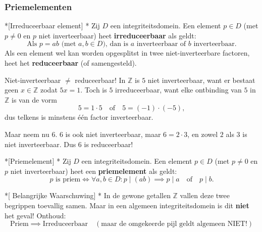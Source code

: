 \subsubsection{Priemelementen}

\begin{nicedefinition}*[Irreduceerbaar element]\label{H4_irreduceerbaar_element}
    \nextpart[]*
    Zij $D$ een integriteitsdomein. Een element $p \in D$ (met $p \neq 0$ en $p$ niet inverteerbaar) heet \textcolor{PineGreen!75!black}{\textbf{irreduceerbaar}} als geldt:
    \begin{equation*}
        \text{Als } p = ab \text{ (met } a,b \in D\text{), dan is } a \text{ inverteerbaar of } b \text{ inverteerbaar.}
    \end{equation*}
    Als een element wel kan worden opgesplitst in twee niet-inverteerbare factoren, heet het \textcolor{PineGreen!75!black}{\textbf{reduceerbaar}} (of samengesteld).
\end{nicedefinition}

\textbf{} Niet-inverteerbaar $\neq$ reduceerbaar! In $\mathbb{Z}$ is $5$ niet inverteerbaar, want er bestaat geen $x\in\mathbb{Z}$ zodat $5x=1$. Toch is $5$ irreduceerbaar, want elke ontbinding van $5$ in $\mathbb{Z}$ is van de vorm
\begin{equation*}
    5=1\cdot 5
    \quad \text{of} \quad
    5=(-1)\cdot(-5),
\end{equation*}
dus telkens is minstens één factor inverteerbaar.

Maar neem nu $6$. $6$ is ook niet inverteerbaar, maar $6 = 2\cdot 3$, en zowel $2$ als $3$ is niet inverteerbaar. Dus $6$ is reduceerbaar!

\begin{nicedefinition}*[Priemelement]
    \nextpart[]*
    Zij $D$ een integriteitsdomein. Een element $p \in D$ (met $p \neq 0$ en $p$ niet inverteerbaar) heet een \textcolor{PineGreen!75!black}{\textbf{priemelement}} als geldt:
    \begin{equation*}
        p \text{ is priem} \iff \forall a,b \in D: p \mid (ab) \implies p \mid a \quad \text{of} \quad p \mid b.
    \end{equation*}
\end{nicedefinition}

\begin{nicenote}*[ Belangrijke Waarschuwing]
    \nextpart[]*
    In de gewone getallen $\mathbb{Z}$ vallen deze twee begrippen toevallig samen. Maar in een algemeen integriteitsdomein is dit \textbf{niet} het geval! Onthoud:
    \begin{equation*}
        \text{Priem} \implies \text{Irreduceerbaar} \quad (\text{maar de omgekeerde pijl geldt algemeen NIET!})
    \end{equation*}
\end{nicenote}

